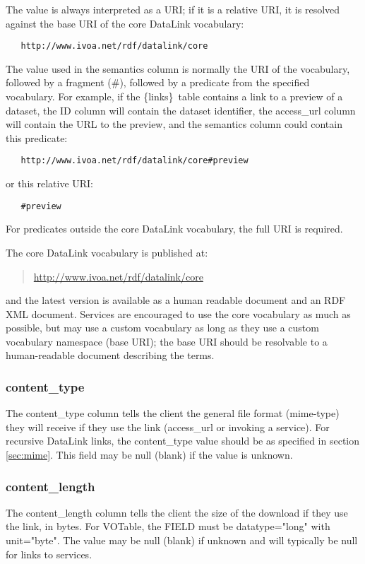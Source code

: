 \documentclass[11pt,a4paper]{ivoa}
\newcommand{\blinks}{\{links\}}
\newcommand{\attval}[2]{#1={\allowbreak}{"}#2{"}}
\begin{document}
The value is always interpreted as a URI; if it is a relative URI,
it is resolved \citep{std:RFC3986} against the base URI of the
core DataLink vocabulary:
\begin{verbatim}
   http://www.ivoa.net/rdf/datalink/core
\end{verbatim}

The value used in the semantics column is normally the URI of the
vocabulary, followed by a fragment (\#), followed by a predicate from
the specified vocabulary.  For example, if the \blinks\ table contains a
link to a preview of a dataset, the ID column will contain the dataset
identifier, the access\_url column will contain the URL to the preview,
and the semantics column could contain this predicate:
\begin{verbatim}
   http://www.ivoa.net/rdf/datalink/core#preview
\end{verbatim}
or this relative URI:
\begin{verbatim}
   #preview
\end{verbatim}
For predicates outside the core DataLink vocabulary,
the full URI is required.

The core DataLink vocabulary is published at:
\begin{quote}
  \url{http://www.ivoa.net/rdf/datalink/core}
\end{quote}
and the latest version is available as a human readable document and an
RDF XML document. Services are encouraged to use the core vocabulary
as much as possible, but may use a custom vocabulary as long as they
use a custom vocabulary namespace (base URI); the base URI should be
resolvable to a human-readable document describing the terms.

\subsubsection{content\_type}

The content\_type column tells the client the general file format
(mime-type) they will receive if they use the link
(access\_url or invoking a service).
For recursive DataLink links, the content\_type value should
be as specified in section \ref{sec:mime}.
This field may be null (blank) if the value is unknown.

\subsubsection{content\_length}

The content\_length column tells the client the size of the download
if they use the link, in bytes. For VOTable, the FIELD must be
\attval{datatype}{long} with \attval{unit}{byte}.
The value may be null (blank)
if unknown and will typically be null for links to services.
\end{document}
